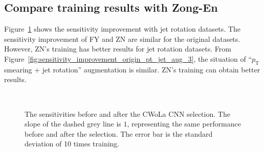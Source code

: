 \documentclass[12pt]{article}
\begin{document}
	\subsection{Compare training results with Zong-En}%
	\label{sub:compare_training_results_with_zong_en}
		Figure~\ref{fig:sensitivity_improvement_origin_jet_aug_3_ZN} shows the sensitivity improvement with jet rotation datasets. The sensitivity improvement of FY and ZN are similar for the original datasets. However, ZN's training has better results for jet rotation datasets. From Figure~\ref{fig:sensitivity_improvement_origin_pt_jet_aug_3}, the situation of ``$p_{\text{T}}$ smearing + jet rotation'' augmentation is similar. ZN's training can obtain better results.
		\begin{figure}[htpb]
			\centering
			 \\
			\caption{The sensitivities before and after the CWoLa CNN selection. The slope of the dashed grey line is $1$, representing the same performance before and after the selection. The error bar is the standard deviation of 10 times training.}
			\label{fig:sensitivity_improvement_origin_jet_aug_3_ZN}
		\end{figure}
\end{document}
